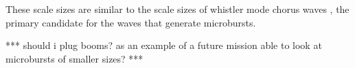\documentclass[draft]{agujournal2019}
\begin{document}
These scale sizes are similar to the scale sizes of whistler mode chorus waves \cite{chorus_scales}, the primary candidate for the waves that generate microbursts.

***
should i plug booms? as an example of a future mission able to look at microbursts of smaller sizes?
***





%
%
%
%
%
%
%
%
%
%
\end{document}
